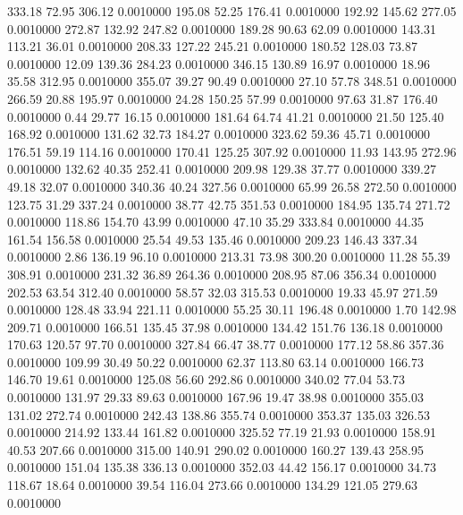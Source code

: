  333.18   72.95  306.12   0.0010000
 195.08   52.25  176.41   0.0010000
 192.92  145.62  277.05   0.0010000
 272.87  132.92  247.82   0.0010000
 189.28   90.63   62.09   0.0010000
 143.31  113.21   36.01   0.0010000
 208.33  127.22  245.21   0.0010000
 180.52  128.03   73.87   0.0010000
  12.09  139.36  284.23   0.0010000
 346.15  130.89   16.97   0.0010000
  18.96   35.58  312.95   0.0010000
 355.07   39.27   90.49   0.0010000
  27.10   57.78  348.51   0.0010000
 266.59   20.88  195.97   0.0010000
  24.28  150.25   57.99   0.0010000
  97.63   31.87  176.40   0.0010000
   0.44   29.77   16.15   0.0010000
 181.64   64.74   41.21   0.0010000
  21.50  125.40  168.92   0.0010000
 131.62   32.73  184.27   0.0010000
 323.62   59.36   45.71   0.0010000
 176.51   59.19  114.16   0.0010000
 170.41  125.25  307.92   0.0010000
  11.93  143.95  272.96   0.0010000
 132.62   40.35  252.41   0.0010000
 209.98  129.38   37.77   0.0010000
 339.27   49.18   32.07   0.0010000
 340.36   40.24  327.56   0.0010000
  65.99   26.58  272.50   0.0010000
 123.75   31.29  337.24   0.0010000
  38.77   42.75  351.53   0.0010000
 184.95  135.74  271.72   0.0010000
 118.86  154.70   43.99   0.0010000
  47.10   35.29  333.84   0.0010000
  44.35  161.54  156.58   0.0010000
  25.54   49.53  135.46   0.0010000
 209.23  146.43  337.34   0.0010000
   2.86  136.19   96.10   0.0010000
 213.31   73.98  300.20   0.0010000
  11.28   55.39  308.91   0.0010000
 231.32   36.89  264.36   0.0010000
 208.95   87.06  356.34   0.0010000
 202.53   63.54  312.40   0.0010000
  58.57   32.03  315.53   0.0010000
  19.33   45.97  271.59   0.0010000
 128.48   33.94  221.11   0.0010000
  55.25   30.11  196.48   0.0010000
   1.70  142.98  209.71   0.0010000
 166.51  135.45   37.98   0.0010000
 134.42  151.76  136.18   0.0010000
 170.63  120.57   97.70   0.0010000
 327.84   66.47   38.77   0.0010000
 177.12   58.86  357.36   0.0010000
 109.99   30.49   50.22   0.0010000
  62.37  113.80   63.14   0.0010000
 166.73  146.70   19.61   0.0010000
 125.08   56.60  292.86   0.0010000
 340.02   77.04   53.73   0.0010000
 131.97   29.33   89.63   0.0010000
 167.96   19.47   38.98   0.0010000
 355.03  131.02  272.74   0.0010000
 242.43  138.86  355.74   0.0010000
 353.37  135.03  326.53   0.0010000
 214.92  133.44  161.82   0.0010000
 325.52   77.19   21.93   0.0010000
 158.91   40.53  207.66   0.0010000
 315.00  140.91  290.02   0.0010000
 160.27  139.43  258.95   0.0010000
 151.04  135.38  336.13   0.0010000
 352.03   44.42  156.17   0.0010000
  34.73  118.67   18.64   0.0010000
  39.54  116.04  273.66   0.0010000
 134.29  121.05  279.63   0.0010000
